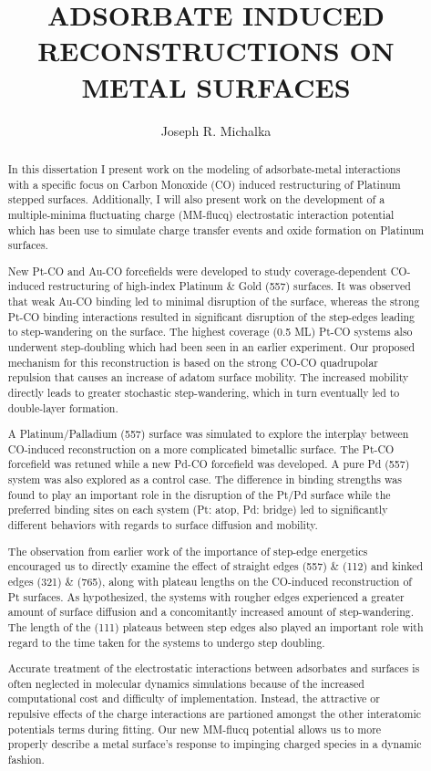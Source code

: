\documentclass[final, numrefs]{nddiss2e}
\begin{document}
\begin{abstract}
\title{ADSORBATE INDUCED RECONSTRUCTIONS ON METAL SURFACES}
\author{Joseph R. Michalka}
In this dissertation I present work on the modeling of adsorbate-metal
interactions with a specific focus on Carbon Monoxide (CO) induced
restructuring of Platinum stepped surfaces. Additionally, I will also present
work on the development of a multiple-minima fluctuating charge (MM-flucq)
electrostatic interaction potential which has been use to simulate charge
transfer events and oxide formation on Platinum surfaces.

New Pt-CO and Au-CO forcefields were developed to study coverage-dependent
CO-induced restructuring of high-index Platinum \& Gold (557) surfaces. It was observed
that weak Au-CO binding led to minimal disruption of the surface, whereas the
strong Pt-CO binding interactions resulted in significant disruption of the
step-edges leading to step-wandering on the surface. The highest coverage (0.5
ML) Pt-CO systems also underwent step-doubling which had been seen in an
earlier experiment. Our proposed mechanism for this reconstruction is based on
the strong CO-CO quadrupolar repulsion that causes an increase of adatom surface
mobility. The increased mobility directly leads to greater stochastic
step-wandering, which in turn eventually led to double-layer formation.

A Platinum/Palladium (557) surface was simulated to explore the interplay between
CO-induced reconstruction on a more complicated bimetallic surface. The Pt-CO
forcefield was retuned while a new Pd-CO forcefield was developed. A pure Pd
(557) system was also explored as a control case. The difference in binding
strengths was found to play an important role in the disruption of the Pt/Pd
surface while the preferred binding sites on each system (Pt: atop, Pd: bridge)
led to significantly different behaviors with regards to surface diffusion and
mobility.

The observation from earlier work of the importance of step-edge energetics
encouraged us to directly examine the effect of straight edges (557) \& (112)
and kinked edges (321) \& (765), along with plateau lengths on the CO-induced
reconstruction of Pt surfaces. As hypothesized, the systems with rougher edges
experienced a greater amount of surface diffusion and a concomitantly increased
amount of step-wandering. The length of the (111) plateaus between step edges
also played an important role with regard to the time taken for the systems to
undergo step doubling.

Accurate treatment of the electrostatic interactions between adsorbates and
surfaces is often neglected in molecular dynamics simulations because of the
increased computational cost and difficulty of implementation. Instead, the
attractive or repulsive effects of the charge interactions are partioned
amongst the other interatomic potentials terms during fitting. Our new MM-flucq
potential allows us to more properly describe a metal surface's response to
impinging charged species in a dynamic fashion.

\end{abstract}
\end{document}
